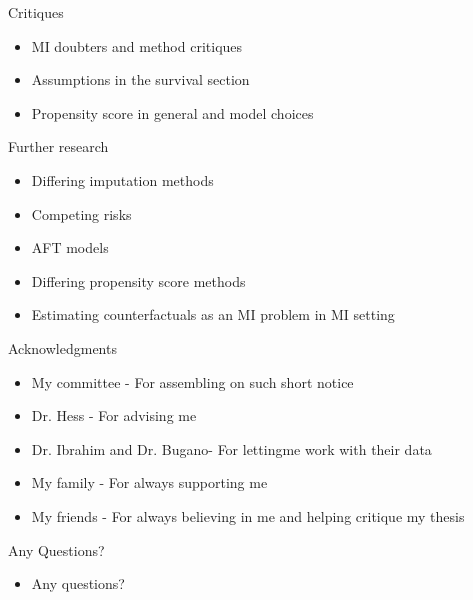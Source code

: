 \begin{frame}{Critiques}
 \begin{itemize}
  \item MI doubters and method critiques
  \item Assumptions in the survival section
  \item Propensity score in general and model choices
 \end{itemize}

\end{frame}


\begin{frame}{Further research}

\begin{itemize}
 \item Differing imputation methods
 \item Competing risks
 \item AFT models
 \item Differing propensity score methods
 \item Estimating counterfactuals as an MI problem in MI setting
 
\end{itemize}

 
\end{frame}

\begin{frame}{Acknowledgments}
 \begin{itemize}
  \item My committee - For assembling on such short notice
  \item Dr. Hess - For advising me 
  \item Dr. Ibrahim and Dr. Bugano- For lettingme work with their data
  \item My family - For always supporting me
  \item My friends - For always believing in me and helping critique my thesis
  
 \end{itemize}

\end{frame}

\begin{frame}{Any Questions?}
\begin{itemize}
 \item Any questions?
\end{itemize}
\end{frame}
